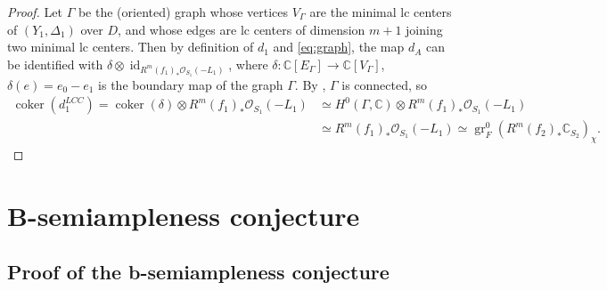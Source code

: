 \documentclass{amsart}
\newcommand{\id}{\operatorname{id}}
\newcommand{\coker}{\operatorname{coker}}
\theoremstyle{definition}
\theoremstyle{remark}
\def\bC{\mathbb{C}}
\def\gr{\operatorname{gr}}
\numberwithin{equation}{section}
\begin{document}
\begin{proof}
Let $\Gamma$ be the (oriented) graph whose vertices $V_{\Gamma}$ are the minimal lc centers of $(Y_1, \Delta_1)$ over $D$, and whose edges are lc centers of dimension $m+1$ joining two minimal lc centers. Then by definition of $d_1$ and \eqref{eq:graph}, the map $d_A$ can be identified with $\delta \otimes \id_{R^m(f_1)_* \mathcal{O}_{S_1}(-L_1)}$, where $\delta \colon \bC[E_\Gamma] \to \bC[V_\Gamma]$, $\delta(e)= e_0 - e_1$  is the boundary map of the graph $\Gamma$. By \cite[Thm.~4.40]{kol13}, $\Gamma$ is connected, so
\begin{align*}
\coker(d^{LCC}_1) = \coker(\delta) \otimes R^m(f_1)_* \mathcal{O}_{S_1}(-L_1) & \simeq H^0(\Gamma, \bC) \otimes  R^m(f_1)_* \mathcal{O}_{S_1}(-L_1) \\
& \simeq R^m(f_1)_* \mathcal{O}_{S_1}(-L_1)\simeq \gr_F^0(R^m(f_2)_*\bC_{S_2})_{\chi}.
\end{align*}
\end{proof}

\section{B-semiampleness conjecture}
\subsection{Proof of the b-semiampleness conjecture} 
\end{document}
